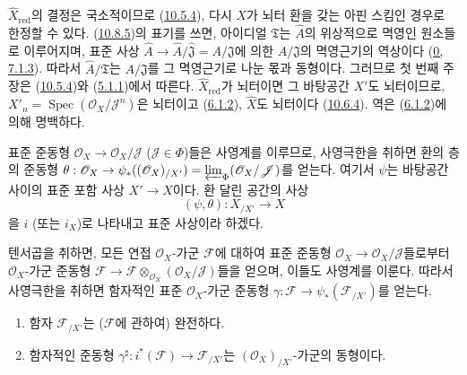 
$\widehat X_{\mathrm{red}}$의 결정은 국소적이므로
(\hyperref[I.10.5.4-ko]{10.5.4}), 다시 $X$가 뇌터 환을 갖는 아핀 스킴인
경우로 한정할 수 있다. (\hyperref[I.10.8.5-ko]{10.8.5})의 표기를
쓰면, 아이디얼 $\mathfrak{T}$는 $\widehat A$의 위상적으로 멱영인
원소들로 이루어지며, 표준 사상
$\widehat A\to\widehat A/\widehat{\mathfrak{J}}=A/\mathfrak{J}$에 의한
$A/\mathfrak{J}$의 멱영근기의 역상이다
(\hyperref[0.7.1.3-ko]{0, 7.1.3}). 따라서
$\widehat A/\mathfrak{T}$는 $A/\mathfrak{J}$를 그 멱영근기로 나눈
몫과 동형이다. 그러므로 첫 번째 주장은
(\hyperref[I.10.5.4-ko]{10.5.4})와
(\hyperref[I.5.1.1-ko]{5.1.1})에서 따른다.
$\widehat X_{\mathrm{red}}$가 뇌터이면 그 바탕공간 $X'$도 뇌터이므로,
$X'_n=\operatorname{Spec}(\mathscr{O}_X/\mathscr{J}^n)$은 뇌터이고
(\hyperref[I.6.1.2-ko]{6.1.2}), $\widehat X$도 뇌터이다
(\hyperref[I.10.6.4-ko]{10.6.4}). 역은
(\hyperref[I.6.1.2-ko]{6.1.2})에 의해 명백하다.

\begin{env}[10.8.7]
\label{I.10.8.7-ko}
표준 준동형 $\mathscr{O}_X\to\mathscr{O}_X/\mathscr{J}$
($\mathscr{J}\in\Phi$)들은 사영계를 이루므로, 사영극한을 취하면 환의
층의 준동형
$\theta:\mathscr{O}_X\to\psi_*((\mathscr{O}_X)_{/X'})
=\varprojlim_\Phi(\mathscr{O}_X/\mathscr{J})$를 얻는다. 여기서 $\psi$는
바탕공간 사이의 표준 포함 사상 $X'\to X$이다. 환 달린 공간의 사상
\[
  (\psi,\theta):X_{/X'}\to X
\]
을 $i$ (또는 $i_X$)로 나타내고 표준 사상이라 하겠다.

텐서곱을 취하면, 모든 연접 $\mathscr{O}_X$-가군 $\mathscr{F}$에 대하여
표준 준동형 $\mathscr{O}_X\to\mathscr{O}_X/\mathscr{J}$들로부터
$\mathscr{O}_X$-가군 준동형
$\mathscr{F}\to
\mathscr{F}\otimes_{\mathscr{O}_X}(\mathscr{O}_X/\mathscr{J})$들을 얻으며,
이들도 사영계를 이룬다. 따라서 사영극한을 취하면 함자적인 표준
$\mathscr{O}_X$-가군 준동형
$\gamma:\mathscr{F}\to\psi_*(\mathscr{F}_{/X'})$를 얻는다.
\end{env}

\begin{proposition}[10.8.8]
\label{I.10.8.8-ko}
\medskip\noindent
\begin{enumerate}
  \item[\rm{(i)}] 함자 $\mathscr{F}_{/X'}$는
    ($\mathscr{F}$에 관하여) 완전하다.
  \item[\rm{(ii)}] 함자적인 준동형
    $\gamma^\sharp:i^*(\mathscr{F})\to\mathscr{F}_{/X'}$는
    $(\mathscr{O}_X)_{/X'}$-가군의 동형이다.
\end{enumerate}
\end{proposition}


